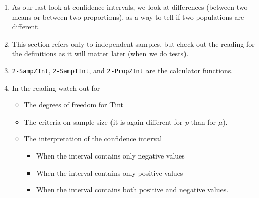 \documentclass{article}
\begin{document}
\begin{enumerate}

    \item As our last look at confidence intervals, we look at differences (between two means or between two proportions), as a way to tell if two populations are different.
    
    \item This section refers only to independent samples, but check out the reading for the definitions as it will matter later (when we do tests).
    
    \item \texttt{2-SampZInt}, \texttt{2-SampTInt}, and \texttt{2-PropZInt} are the calculator functions.
    
    \item In the reading watch out for
    
        \begin{itemize}
        
            \item The degrees of freedom for Tint
            
            \item The criteria on sample size (it is again different for $p$ than for $\mu$).
            
            \item The interpretation of the confidence interval
                
            \begin{itemize}
                
                \item When the interval contains only negative values
                
                \item When the interval contains only positive values
                
                \item When the interval contains both positive and negative values.
                
            \end{itemize}
            
        \end{itemize}
        
\end{enumerate}
\end{document}
